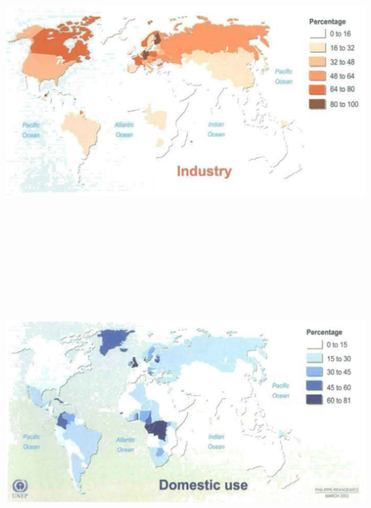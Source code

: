 \documentclass[]{article}
\begin{document}
\hypertarget{section-23}{%
\subsection{}\label{section-23}}

\includegraphics[width=\textwidth,height=4.16667in]{figures/m10_global_industry.png}

\hypertarget{section-24}{%
\subsection{}\label{section-24}}

\includegraphics[width=\textwidth,height=4.16667in]{figures/m10_global_domestic.png}
\end{document}
